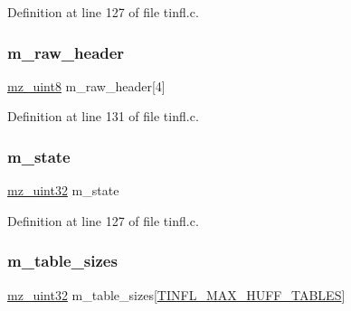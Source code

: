 Definition at line 127 of file tinfl.\+c.

\mbox{\label{structtinfl__decompressor__tag_aa3d6b1b25edb9394236255bf7242f7b2}} 
\subsubsection{\texorpdfstring{m\_raw\_header}{m\_raw\_header}}
{\footnotesize\ttfamily \mbox{\hyperlink{tinfl_8c_a9354eca32f90733aa9bb3738c92da596}{mz\+\_\+uint8}} m\+\_\+raw\+\_\+header\mbox{[}4\mbox{]}}



Definition at line 131 of file tinfl.\+c.

\mbox{\label{structtinfl__decompressor__tag_a89e483db0cdc8fe1f6663ad068eec049}} 
\subsubsection{\texorpdfstring{m\_state}{m\_state}}
{\footnotesize\ttfamily \mbox{\hyperlink{tinfl_8c_ab1a91818a39ac203d5d9f12a003e8557}{mz\+\_\+uint32}} m\+\_\+state}



Definition at line 127 of file tinfl.\+c.

\mbox{\label{structtinfl__decompressor__tag_ac2c9488f8d9b25bf30309b73420a2452}} 
\subsubsection{\texorpdfstring{m\_table\_sizes}{m\_table\_sizes}}
{\footnotesize\ttfamily \mbox{\hyperlink{tinfl_8c_ab1a91818a39ac203d5d9f12a003e8557}{mz\+\_\+uint32}} m\+\_\+table\+\_\+sizes\mbox{[}\mbox{\hyperlink{tinfl_8c_adf764cbdea00d65edcd07bb9953ad2b7ad908ef7390a1643b0f0dece0d816bd64}{T\+I\+N\+F\+L\+\_\+\+M\+A\+X\+\_\+\+H\+U\+F\+F\+\_\+\+T\+A\+B\+L\+ES}}\mbox{]}}



